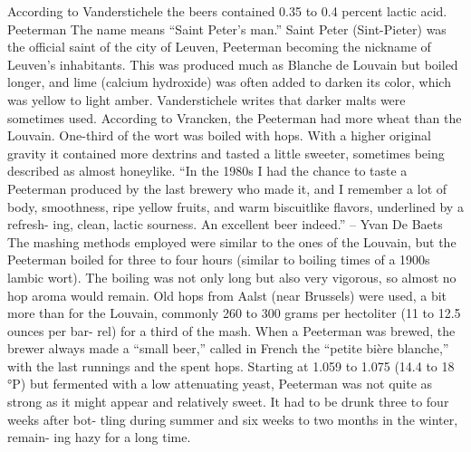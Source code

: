 \documentclass[a4paper,parskip=half]{scrartcl}
\begin{document}
According to Vanderstichele the beers contained 0.35 to 0.4 percent
lactic acid.
Peeterman
The name means “Saint Peter’s man.” Saint Peter (Sint-Pieter) was the
official saint of the city of Leuven, Peeterman becoming the nickname of
Leuven’s inhabitants.
This was produced much as Blanche de Louvain but boiled longer,
and lime (calcium hydroxide) was often added to darken its color, which
was yellow to light amber. Vanderstichele writes that darker malts were
sometimes used. According to Vrancken, the Peeterman had more wheat
than the Louvain. One-third of the wort was boiled with hops.
With a higher original gravity it contained more dextrins and tasted
a little sweeter, sometimes being described as almost honeylike.
“In the 1980s I had the chance to taste a Peeterman produced by the
last brewery who made it, and I remember a lot of body, smoothness,
ripe yellow fruits, and warm biscuitlike ﬂavors, underlined by a refresh-
ing, clean, lactic sourness. An excellent beer indeed.”
– Yvan De Baets
The mashing methods employed were similar to the ones of the
Louvain, but the Peeterman boiled for three to four hours (similar to
boiling times of a 1900s lambic wort). The boiling was not only long
but also very vigorous, so almost no hop aroma would remain. Old hops
from Aalst (near Brussels) were used, a bit more than for the Louvain,
commonly 260 to 300 grams per hectoliter (11 to 12.5 ounces per bar-
rel) for a third of the mash.
When a Peeterman was brewed, the brewer always made a “small
beer,” called in French the “petite bière blanche,” with the last runnings
and the spent hops.
Starting at 1.059 to 1.075 (14.4 to 18 °P) but fermented with a low
attenuating yeast, Peeterman was not quite as strong as it might appear
and relatively sweet. It had to be drunk three to four weeks after bot-
tling during summer and six weeks to two months in the winter, remain-
ing hazy for a long time.

\parencite[45]{Hieronymus2010}
\end{document}
